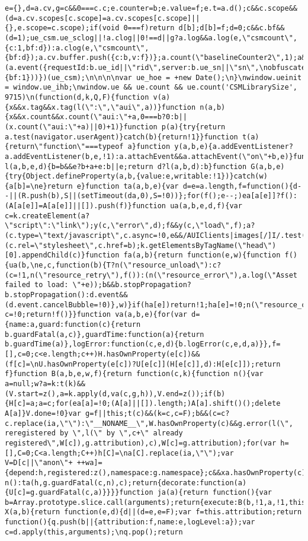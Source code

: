 \documentclass[
]{article}
\begin{document}
\begin{verbatim}
e={},d=a.cv,g=c&&0===c.c;e.counter=b;e.value=f;e.t=a.d();c&&c.scope&&(d=a.cv.scopes[c.scope]=a.cv.scopes[c.scope]||{},e.scope=c.scope);if(void 0===f)return d[b];d[b]=f;d=0;c&&c.bf&&(d=1);ue_csm.ue_sclog||!a.clog||0!==d||g?a.log&&a.log(e,\"csmcount\",{c:1,bf:d}):a.clog(e,\"csmcount\",{bf:d});a.cv.buffer.push({c:b,v:f})};a.count(\"baselineCounter2\",1);a&&a.event&&(a.event({requestId:b.ue_id||\"rid\",server:b.ue_sn||\"sn\",\nobfuscatedMarketplaceId:b.ue_mid||\"mid\"},\"csm\",\"csm.CSMBaselineEvent.4\"),a.count(\"nexusBaselineCounter\",1,{bf:1}))})(ue_csm);\n\n\n\nvar ue_hoe = +new Date();\n}\nwindow.ueinit = window.ue_ihb;\nwindow.ue && ue.count && ue.count('CSMLibrarySize', 9715)\n(function(d,k,Q,F){function v(a){x&&x.tag&&x.tag(l(\":\",\"aui\",a))}function n(a,b){x&&x.count&&x.count(\"aui:\"+a,0===b?0:b||(x.count(\"aui:\"+a)||0)+1)}function p(a){try{return a.test(navigator.userAgent)}catch(b){return!1}}function t(a){return\"function\"===typeof a}function y(a,b,e){a.addEventListener?a.addEventListener(b,e,!1):a.attachEvent&&a.attachEvent(\"on\"+b,e)}function l(a,b,e,d){b=b&&e?b+a+e:b||e;return d?l(a,b,d):b}function G(a,b,e){try{Object.defineProperty(a,b,{value:e,writable:!1})}catch(w){a[b]=\ne}return e}function ta(a,b,e){var d=e=a.length,f=function(){d--||(R.push(b),S||(setTimeout(da,0),S=!0))};for(f();e--;)ea[a[e]]?f():(A[a[e]]=A[a[e]]||[]).push(f)}function ua(a,b,e,d,f){var c=k.createElement(a?\"script\":\"link\");y(c,\"error\",d);f&&y(c,\"load\",f);a?(c.type=\"text/javascript\",c.async=!0,e&&/AUIClients|images[/]I/.test(b)&&c.setAttribute(\"crossorigin\",\"anonymous\"),c.src=b):(c.rel=\"stylesheet\",c.href=b);k.getElementsByTagName(\"head\")[0].appendChild(c)}function fa(a,b){return function(e,w){function f(){ua(b,\ne,c,function(b){T?n(\"resource_unload\"):c?(c=!1,n(\"resource_retry\"),f()):(n(\"resource_error\"),a.log(\"Asset failed to load: \"+e));b&&b.stopPropagation?b.stopPropagation():d.event&&(d.event.cancelBubble=!0)},w)}if(ha[e])return!1;ha[e]=!0;n(\"resource_count\");var c=!0;return!f()}}function va(a,b,e){for(var d={name:a,guard:function(c){return b.guardFatal(a,c)},guardTime:function(a){return b.guardTime(a)},logError:function(c,e,d){b.logError(c,e,d,a)}},f=[],c=0;c<e.length;c++)H.hasOwnProperty(e[c])&&(f[c]=\nU.hasOwnProperty(e[c])?U[e[c]](H[e[c]],d):H[e[c]]);return f}function B(a,b,e,w,f){return function(c,k){function n(){var a=null;w?a=k:t(k)&&(V.start=z(),a=k.apply(d,va(c,g,h)),V.end=z());if(b){H[c]=a;a=c;for(ea[a]=!0;(A[a]||[]).length;)A[a].shift()();delete A[a]}V.done=!0}var g=f||this;t(c)&&(k=c,c=F);b&&(c=c?c.replace(ia,\"\"):\"__NONAME__\",W.hasOwnProperty(c)&&g.error(l(\", reregistered by \",l(\" by \",c+\" already registered\",W[c]),g.attribution),c),W[c]=g.attribution);for(var h=[],C=0;C<a.length;C++)h[C]=\na[C].replace(ia,\"\");var V=D[c||\"anon\"+ ++wa]={depend:h,registered:z(),namespace:g.namespace};c&&xa.hasOwnProperty(c);e?n():ta(h,g.guardFatal(c,n),c);return{decorate:function(a){U[c]=g.guardFatal(c,a)}}}}function ja(a){return function(){var b=Array.prototype.slice.call(arguments);return{execute:B(b,!1,a,!1,this),register:B(b,!0,a,!1,this)}}}function X(a,b){return function(e,d){d||(d=e,e=F);var f=this.attribution;return function(){q.push(b||{attribution:f,name:e,logLevel:a});var c=d.apply(this,arguments);\nq.pop();return 
\end{verbatim}
\end{document}
